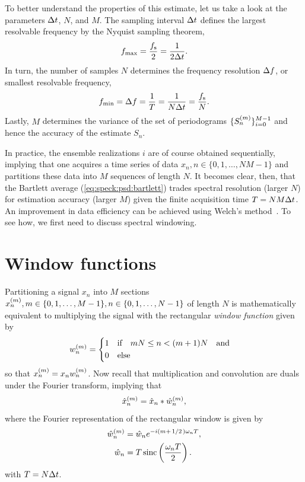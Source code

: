 To better understand the properties of this estimate, let us take a look at the parameters $\Delta t$, $N$, and $M$.
The sampling interval $\Delta t$ defines the largest resolvable frequency by the Nyquist sampling theorem,
\begin{align}\label{eq:speck:f_max}
    f_{\mathrm{max}} = \frac{f_{\mathrm{s}}}{2} = \frac{1}{2\Delta t}.
\end{align}
In turn, the number of samples $N$ determines the frequency resolution $\Delta f$, or smallest resolvable frequency,
\begin{align}\label{eq:speck:f_min}
    f_{\mathrm{min}} = \Delta f = \frac{1}{T} = \frac{1}{N\Delta t} = \frac{f_{\mathrm{s}}}{N}.
\end{align}
Lastly, $M$ determines the variance of the set of periodograms $\lbrace S_n^{(m)}\rbrace_{i=0}^{M-1}$ and hence the accuracy of the estimate $S_n$.

In practice, the ensemble realizations $i$ are of course obtained sequentially, implying that one acquires a time series of data $x_n, n\in\lbrace0, 1, \dotsc, NM - 1\rbrace$ and partitions these data into $M$ sequences of length $N$.
It becomes clear, then, that the Bartlett average (\cref{eq:speck:psd:bartlett}) trades spectral resolution (larger $N$) for estimation accuracy (larger $M$) given the finite acquisition time $T = NM\Delta t$.
An improvement in data efficiency can be achieved using Welch's method~\cite{Welch1967}.
To see how, we first need to discuss spectral windowing.

\section{Window functions}\label{sec:speck:theory:windows}
Partitioning a signal $x_n$ into $M$ sections $x_n^{(m)}, m\in\lbrace 0,1,\dotsc,M-1\rbrace, n\in\lbrace 0,1,\dotsc,N-1\rbrace$ of length $N$ is mathematically equivalent to multiplying the signal with the rectangular \emph{window function} given by
\begin{align}\label{eq:speck:window:boxcar}
    w_n\gth{m} =
    \begin{dcases}
        1 &\qif* m N \leq n < (m+1) N\qand \\
        0 &\qelse*
    \end{dcases}
\end{align}
so that $x_n^{(m)} = x_n w_n^{(m)}$.
Now recall that multiplication and convolution are duals under the Fourier transform, implying that
\begin{align}\label{eq:speck:window:ft_pairs}
    \hat{x}_n^{(m)} = \hat{x}_n \ast \hat{w}_n^{(m)},
\end{align}
where the Fourier representation of the rectangular window is given by
\begin{align}
    \hat{w}_n\gth{m} &= \hat{w}_n \e^{-\i(m + \flatfrac{1}{2})\omega_n T}, \label{eq:speck:window:boxcar:fourier}\\
             \hat{w}_n &= T\sinc\left(\frac{\omega_n T}{2}\right). \label{eq:speck:window:boxcar:fourier:unshifted}
\end{align}
with $T=N\Delta t$.


